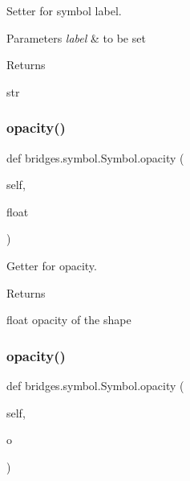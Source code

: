 Setter for symbol label. 


\begin{DoxyParams}{Parameters}
{\em label} & to be set \\
\hline
\end{DoxyParams}
\begin{DoxyReturn}{Returns}


str 
\end{DoxyReturn}
\mbox{\label{classbridges_1_1symbol_1_1_symbol_a332e9461ed001268a100af2ad5a535e9}} 
\subsubsection{\texorpdfstring{opacity()}{opacity()}\hspace{0.1cm}{\footnotesize\ttfamily [1/2]}}
{\footnotesize\ttfamily def bridges.\+symbol.\+Symbol.\+opacity (\begin{DoxyParamCaption}\item[{}]{self,  }\item[{}]{float }\end{DoxyParamCaption})}



Getter for opacity. 

\begin{DoxyReturn}{Returns}


float opacity of the shape 
\end{DoxyReturn}
\mbox{\label{classbridges_1_1symbol_1_1_symbol_afea86f6d7c341168810c09159780ea83}} 
\subsubsection{\texorpdfstring{opacity()}{opacity()}\hspace{0.1cm}{\footnotesize\ttfamily [2/2]}}
{\footnotesize\ttfamily def bridges.\+symbol.\+Symbol.\+opacity (\begin{DoxyParamCaption}\item[{}]{self,  }\item[{}]{o }\end{DoxyParamCaption})}



